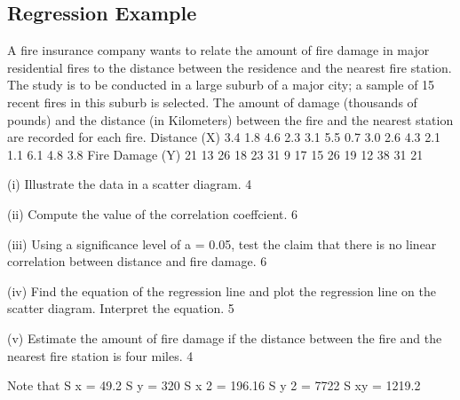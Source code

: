 \subsection{Regression Example} 

A fire insurance company wants to relate the amount of fire damage in major residential fires to the distance between the residence and the nearest fire station. The study is to be conducted in a large suburb of a major city; a sample of 15 recent fires in this suburb is selected. The amount of damage (thousands of pounds) and the distance (in Kilometers) between the fire and the nearest station are recorded for each fire. 
Distance (X)  3.4   1.8    4.6    2.3    3.1    5.5    0.7    3.0    2.6    4.3    2.1    1.1    6.1    4.8   3.8 
Fire Damage (Y)   21    13     26     18     23     31     9       17     15     26     19     12     38     31    21    

(i)   Illustrate the data in a scatter diagram. 4 

(ii)  Compute the value of the correlation coeffcient. 6 

(iii) Using a significance level of a = 0.05, test the claim that there is no linear      correlation  between distance and fire damage.  6 

(iv)  Find the equation of the regression line and plot the regression line on the scatter  diagram. Interpret the equation. 5 

(v)  Estimate the amount of fire damage if the distance between the fire and the  nearest  fire station is four miles. 4 

Note that 
S x = 49.2 
S y = 320 
S x 2 = 196.16 
S y 2 = 7722 
S xy = 1219.2 


\newpage